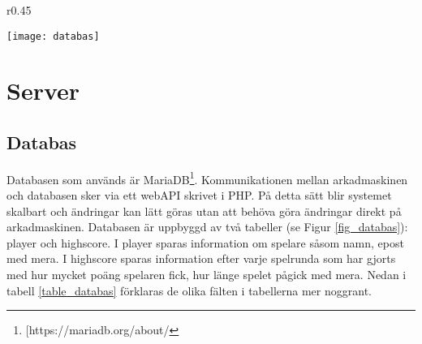 \documentclass[12pt,fleqn,openany]{book} %
\begin{document}
\begin{wrapfigure}{r}{0.45\textwidth}
  \begin{center}
    \texttt{[image: databas]}
  \end{center}
  \caption{Databastabeller}
  \label{fig_databas}
\end{wrapfigure}

\section{Server}
\subsection{Databas}

Databasen som används är MariaDB\footnote{[https://mariadb.org/about/}. Kommunikationen mellan arkadmaskinen och databasen 
sker via ett webAPI skrivet i PHP. På detta sätt blir systemet skalbart och ändringar kan lätt göras utan att behöva göra 
ändringar direkt på arkadmaskinen. Databasen är uppbyggd av två tabeller (se Figur \ref{fig_databas}): player och highscore.
\clearpage
I player sparas information om spelare såsom namn, epost med mera. I highscore sparas information efter varje spelrunda som
har gjorts med hur mycket poäng spelaren fick, hur länge spelet pågick med mera. Nedan i tabell \ref{table_databas} förklaras de olika fälten
i tabellerna mer noggrant.


\begin{table}[!h]
\centering
{}
\caption{Förklaring av databastabell}
\label{table_databas}
\end{table}
\end{document}
